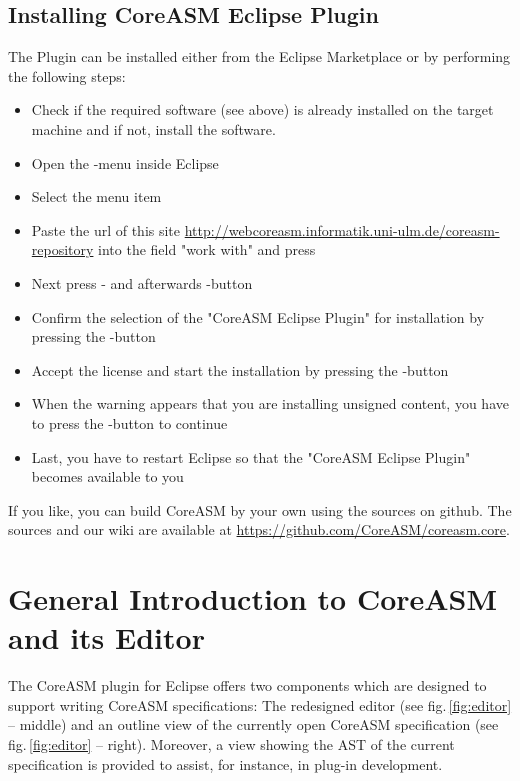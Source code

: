 \documentclass[10pt,oneside,a4paper]{article}
\begin{document}
\subsection{Installing CoreASM Eclipse Plugin}

The Plugin can be installed either from the Eclipse Marketplace or by performing the following steps:

\begin{itemize}
\item Check if the required software (see above) is already installed on the target machine and if not, install the software.
\item Open the -menu inside Eclipse
\item Select the menu item 
\item Paste the url of this site \url{http://webcoreasm.informatik.uni-ulm.de/coreasm-repository} into the field "work with" and press 
\item Next press - and afterwards -button
\item Confirm the selection of the "CoreASM Eclipse Plugin" for installation by pressing the -button
\item Accept the license and start the installation by pressing the -button
\item When the warning appears that you are installing unsigned content, you have to press the -button to continue
\item Last, you have to restart Eclipse so that the "CoreASM Eclipse Plugin" becomes available to you
\end{itemize}

If you like, you can build CoreASM by your own using the sources on github. The sources and our wiki are available at \url{https://github.com/CoreASM/coreasm.core}.


\section{General Introduction to CoreASM and its Editor}
The CoreASM plugin for Eclipse offers two components which are designed to support writing CoreASM specifications: The redesigned editor (see fig.\,\ref{fig:editor} -- middle) and an outline view of the currently open CoreASM specification (see fig.\,\ref{fig:editor} -- right).
Moreover, a view showing the AST of the current specification is provided to assist, for instance, in plug-in development.
\end{document}
